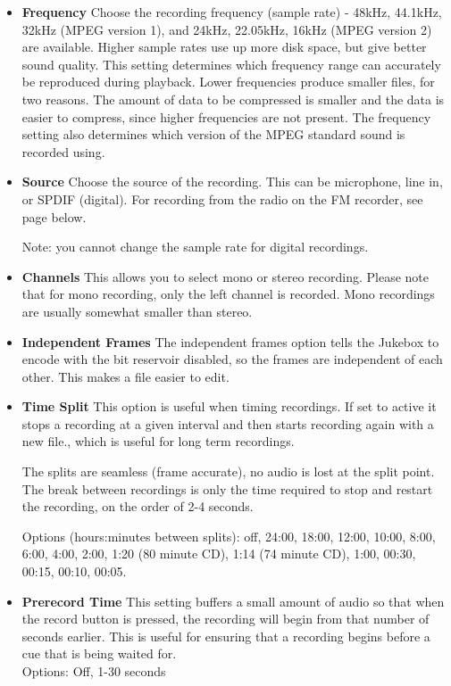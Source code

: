\begin{itemize}
\item \textbf{Frequency} 
Choose the recording frequency (sample rate) {}- 48kHz, 44.1kHz,
32kHz (MPEG version 1), and 24kHz, 22.05kHz, 16kHz (MPEG version 2) are
available.  Higher sample rates use up more disk space, but give better
sound quality.  This setting determines which frequency range can
accurately be reproduced during playback. Lower frequencies produce
smaller files, for two reasons.  The amount of data to be compressed is
smaller and the data is easier to compress, since higher frequencies
are not present.  The frequency setting also determines which version
of the MPEG standard sound is recorded using.

\item \textbf{Source}
Choose the source of the recording.  This can be microphone, line in, 
or SPDIF (digital). For recording from the radio on the FM recorder,
see page \pageref{ref:FMradio} below.

Note: you cannot change the sample rate for digital recordings.

\item \textbf{Channels}
This allows you to select mono or stereo recording.  Please note that
for mono recording, only the left channel is recorded.  Mono recordings
are usually somewhat smaller than stereo.

\item \textbf{Independent Frames}
The independent frames option tells the Jukebox to encode with the bit
reservoir disabled, so the frames are independent of each other. This
makes a file easier to edit.

\item \textbf{Time Split}
This option is useful when timing recordings. If set to active it stops
a recording at a given interval and then starts recording again with a
new file., which is useful for long term recordings.

The splits are seamless (frame accurate), no audio is lost at the split
point. The break between recordings is only the time required to stop
and restart the recording, on the order of 2{}-4 seconds.

Options (hours:minutes between splits): off, 24:00, 18:00, 12:00, 10:00,
8:00, 6:00, 4:00, 2:00, 1:20 (80 minute CD), 1:14 (74 minute  CD),
1:00, 00:30, 00:15, 00:10, 00:05.
\item \textbf{Prerecord Time}
This setting buffers a small amount of audio so that when the
record button is pressed, the recording will begin from that number of
seconds earlier.  This is useful for ensuring that a recording begins
before a cue that is being waited for.\\

Options: Off, 1{}-30 seconds
\end{itemize}

